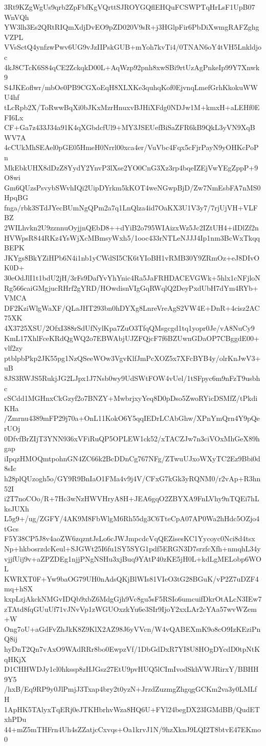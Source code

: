 3Rt9KZgWgUs9qrb2ZpFbfKgVQrttSJROYGQflEHQuFCSWPTqHrLsF1UpB07WnVQh
YW3lh3Es2QRtRIQmXdjDvEO9pZD020V9sR+j3HGlpFir6PbDiXwmgRAFZghgVZPL
VVsSctQ4ynfzwPwv6UG9vJzIIPskGUB+mYoh7kvTi4/0TNAN6oY4tVH5Lnkldjoc
4kJ8CTcK6S84qCE2ZckqkD00L+AqWzp92pnh8xwSBi9rtUzAgPnkeIp99Y7Xnwk9
S4JKEoflwr/mbOe0PB9CGXoEqH8XLXKe3quhqKof0EjvnqLmefGrhKkokuWWU4hf
tLcRpb2X/ToRwwBqXi0bJKxMzrHnuxvBJHiXFdg0NDJw1M+kmxH+aLEHf0EFI6Lx
CF+Ga7z433J34a91K4qXGbdcfUl9+MY3JSEUefBiSaZFR6kB9QkL3yVN9XqBWV7A
4cCUkMhSEAel0pGE05HmeH0Nrrl00xca4er/VuVbc4Fqx5cFjrPayN9yOHKcPoPn
MkEbkUHX8dDzZ8YydY2YnvP3lXse2YO0CnG3Xz3rp4bqeIZEjVwYEgZppP+9O8wi
Gm6QUzsPsvybSWvhIQi2UipDYrkm5kKOT4weNGwpBjD/Zw7NmEsbFA7nMS0HpqBG
fnga/rbk3STdJYecBUmNgQPm2a7q1LnQlza4id7OaKX3U1V3y7/7rjUjVH+VLFBZ
2WILhvkn2U9zznnuOyjjnQEbD8++dYiB2o795WIAizxWz5Jc2IZtUH4+iIDlZf2n
HVWpsR844RKz4YsWjXcMBmsyWxh5/1ooc433rNTLeNJJJ4Ip1nm3BcWxTkqqBEPK
JKYgs8BkYZiHPb6N4i1nb1yCWdSI5CK6tYIoBH1vRMB30Y9ZRmOz+eJ8DIvOK0D+
30eOdJlI1t1bdU2jH/3rFs9DafYvYhYnic4Ra5JaFRHDACEVGWk+5hlx1cNFjloN
Rg566caiGMgjucRHrf2gYRD/HOwdisnVIgGqRWqlQ2DeyPxdUbH7dYm4RYb+VMCA
DF2KziWlgWaXF/QLaJHT293bn0hDYXg8LnreVreAgS2VW4E+DnR+4cisz2AC75XK
4X3725XSU/2OfxI388rSdUfNylKpa7ZuO3TfqQMsgcgd1tq1yopr0Je/vA8NuCy9
KmL17XhlFceKRdQgWQ2o7EBWAbjUJZFQjcF7f6BZUwnGDaOP7CBggdE00+vlf2zy
ptblpbPkp2JK55pg1NzQSeeWOw3VgvKlfJmPcXOZ5x7XFcBYB4y/olrKnJwV3+uB
8JS3RWJS5RukjJG2LJpx1J7Nsb0wy9UdSWtFOW4vUel/1tSFpyc6m9nFzT9usbhc
cSCdd1MGHnxCkGzyf2o7BNZY+MwbrjxyYeq8D0pDso5ZwoRYicDSMfZ/tPkdiKHa
/Zmrnu4389mFP29j70a+OnL11KokO6Y5qqIEDrLCAbGhw/XPnYmQrn4Y9pQerUOj
0DfvfBrZIjT3YNN936xVFiRuQP5OPLEW1ck52/xTACZJw7n3ciVOxMhGeX89hgap
iIpqzHMOQmtpohnGN4ZC66k2BcDDnCg767NFg/ZTwuUJxoWXyTC2Ez9Bbi0d8sIc
h28plQUzogh5o/GY9R9BnIaO1FMa4v9j4V/CFxG7kGk3yRQNM0/r2vAp+R3hn52I
i2T7noCOo/R+7Hc3wNzHWVHryA8H+JEA6gqO2ZBYXA9FnLVhy9nTQEi7hLksJUXh
L5g9+/ug/ZGFY/4AK9M8FbWlgM6Rh55dg3C6TteCpA07AP0Wa2hHdc5OZjo4tGcs
F5Y38CP5J8v4aoZW6zqzntJsLo6cJWJmpcdcVqQEZisesKC1Yycoyc0Nci8d4tsx
Np+hkbosrzdcKeul+SJGWt25I6fu1SY5SYG1pdf5ERGN3D7srzfcXfh+nmqhL34y
vjjfUij9v+aZPZDEg1njjPNgNSHu3xjBuq9YAtP40zKE5jH0L+kdLgMELobp6WOL
KWRXT0F+Yw9baOG79UH0nAdsQKjBlWIs81VIeO3tG28BGuK/vP2Z7uDZF4mq+hSX
kxpLzjAkckNMGvIDQb9xbZ6MdgGjh9Vc8gu5sF5RSIo6umcuifDkrOtALcN3IEw7
zTAtd8fqGUuUf71vJNvVp1zWGUOxzkYu6e3SIr9IjoY2xxLAr2cYAa57wvWZem+W
Ong7oU+aGdFvZhJkK8Z9KlX2AZ98J6yVVcn/W4vQABEXmK9o8cO9IzKEziPnQ8ij
hyDnT2Qn7vAxO9WAdRRr8bo0EwpzVf/1DbGdDxR7YI8U8HOgDYcdD0tpNtKqHKjX
D1CHHWDJy1cl0hkssp8zHJGsz27EtU9pvHUQ5lCImIvodSkhVWJRirxY/BBHH9Y5
/hxB/Eq9RP9y0JlPmjJ3Txap4bry2t0yzN+JrzdZuzmgZhgqgGCKm2va3y0LMLfH
1ApHK5TAlyxTqERj0eJTKHbrhvWza8HQ6U+FYl24begDX23IGMdBB/QudETxhPDu
44+mZ5mTHFrn4Uh4sZZatjcCxvqs+Oa1krvJ1N/9hzXknJ9LQI2T8btvE47EKmo0
